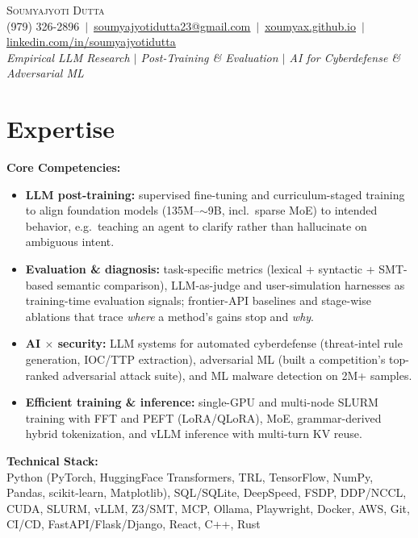 \documentclass[letterpaper,11pt]{article}
\begin{document}
\begin{center}
    {\Huge \scshape Soumyajyoti Dutta} \\ \vspace{2pt}
    \small (979) 326-2896 \,$|$\,
    \href{mailto:soumyajyotidutta23@gmail.com}{\underline{soumyajyotidutta23@gmail.com}} \,$|$\,
    \href{https://xoumyax.github.io/}{\underline{xoumyax.github.io}} \,$|$\,
    \href{https://www.linkedin.com/in/soumyajyotidutta/}{\underline{linkedin.com/in/soumyajyotidutta}}
    \\ \vspace{2pt}
    \small \textit{Empirical LLM Research $|$ Post-Training \& Evaluation $|$ AI for Cyberdefense \& Adversarial ML}
\end{center}

\section{Expertise}

\textbf{Core Competencies:}
\begin{itemize}\small
  \item \textbf{LLM post-training:} supervised fine-tuning and curriculum-staged training to align foundation models (135M--$\sim$9B, incl.\ sparse MoE) to intended behavior, e.g.\ teaching an agent to clarify rather than hallucinate on ambiguous intent.
  \item \textbf{Evaluation \& diagnosis:} task-specific metrics (lexical + syntactic + SMT-based semantic comparison), LLM-as-judge and user-simulation harnesses as training-time evaluation signals; frontier-API baselines and stage-wise ablations that trace \textit{where} a method's gains stop and \textit{why}.
  \item \textbf{AI $\times$ security:} LLM systems for automated cyberdefense (threat-intel rule generation, IOC/TTP extraction), adversarial ML (built a competition's top-ranked adversarial attack suite), and ML malware detection on 2M+ samples.
  \item \textbf{Efficient training \& inference:} single-GPU and multi-node SLURM training with FFT and PEFT (LoRA/QLoRA), MoE, grammar-derived hybrid tokenization, and vLLM inference with multi-turn KV reuse.
\end{itemize}

\vspace{2pt}
\textbf{Technical Stack:}\\
\small Python (PyTorch, HuggingFace Transformers, TRL, TensorFlow, NumPy, Pandas, scikit-learn, Matplotlib), SQL/SQLite, DeepSpeed, FSDP, DDP/NCCL, CUDA, SLURM, vLLM, Z3/SMT, MCP, Ollama, Playwright, Docker, AWS, Git, CI/CD, FastAPI/Flask/Django, React, C++, Rust
\normalsize
\end{document}
